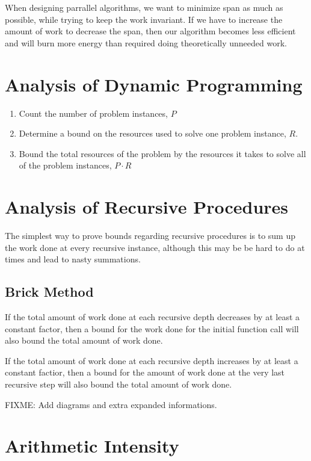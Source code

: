 \documentclass[12pt, letterpaper]{book}
\begin{document}
When designing parrallel algorithms, we want to minimize span as much as possible, while trying to keep the work invariant. If we have to increase the amount of work to decrease the span, then our algorithm becomes less efficient and will burn more energy than required doing theoretically unneeded work.

\section{Analysis of Dynamic Programming}

\begin{enumerate}
  \item Count the number of problem instances, $P$
  \item Determine a bound on the resources used to solve one problem instance, $R$.
  \item Bound the total resources of the problem by the resources it takes to solve all of the problem instances, $P \cdot R$
\end{enumerate}

\section{Analysis of Recursive Procedures}

The simplest way to prove bounds regarding recursive procedures is to sum up the work done at every recursive instance, although this may be be hard to do at times and lead to nasty summations.

\subsection{Brick Method}
If the total amount of work done at each recursive depth decreases by at least a constant factor, then a bound for the work done for the initial function call will also bound the total amount of work done.

If the total amount of work done at each recursive depth increases by at least a constant factior, then a bound for the amount of work done at the very last recursive step will also bound the total amount of work done.

FIXME: Add diagrams and extra expanded informations.

\section{Arithmetic Intensity}
\end{document}
